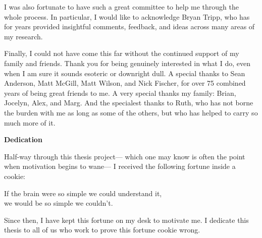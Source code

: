 I was also fortunate to have such a great committee
to help me through the whole process.
In particular, I would like to acknowledge Bryan Tripp,
who has for years provided insightful comments, feedback, and ideas
across many areas of my research.

Finally, I could not have come this far
without the continued support of my family and friends.
Thank you for being genuinely interested in what I do,
even when I am sure it sounds esoteric or downright dull.
A special thanks to Sean Anderson, Matt McGill, Matt Wilson, and Nick Fischer,
for over 75 combined years of being great friends to me.
A very special thanks my family: Brian, Jocelyn, Alex, and Marg.
And the specialest thanks to Ruth,
who has not borne the burden with me as long as some of the others,
but who has helped to carry so much more of it.


\cleardoublepage


\begin{center}\textbf{Dedication}\end{center}

\noindent
Half-way through this thesis project---%
which one may know is often the point when motivation begins to wane---%
I received the following fortune inside a cookie:
\begin{displayquote}
If the brain were so simple we could understand it,\\
we would be so simple we couldn't.
\end{displayquote}
Since then, I have kept this fortune on my desk to motivate me.
I dedicate this thesis to all of us
who work to prove this fortune cookie wrong.


\cleardoublepage

\renewcommand\contentsname{Table of Contents}
\tableofcontents
\cleardoublepage
{}

